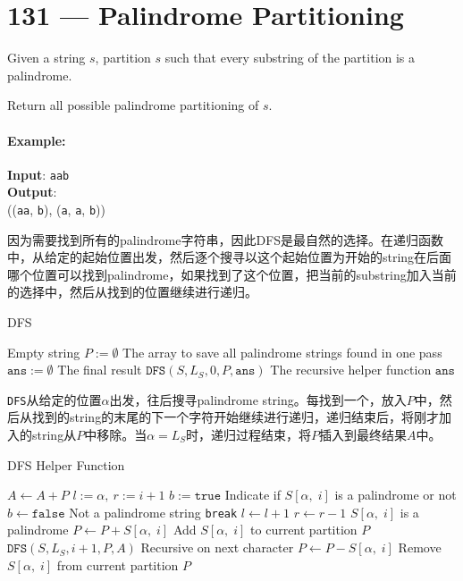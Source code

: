 \section{131 --- Palindrome Partitioning}
Given a string $s$, partition $s$ such that every substring of the partition is a palindrome.
\par
Return all possible palindrome partitioning of $s$.
\paragraph{Example:}
\begin{flushleft}
\textbf{Input}: \texttt{aab}
\\
\textbf{Output}:
\\
((\texttt{aa}, \texttt{b}), (\texttt{a}, \texttt{a}, \texttt{b}))
\end{flushleft}
因为需要找到所有的palindrome字符串，因此DFS是最自然的选择。在递归函数中，从给定的起始位置出发，然后逐个搜寻以这个起始位置为开始的string在后面哪个位置可以找到palindrome，如果找到了这个位置，把当前的substring加入当前的选择中，然后从找到的位置继续进行递归。

\setcounter{algorithm}{0}
\begin{algorithm}[H]
\caption{DFS}
\begin{algorithmic}[1]
\State \Return \Comment Empty string
\EndIf
\State $P:=\emptyset$ \Comment The array to save all palindrome strings found in one pass
\State $\texttt{ans} := \emptyset$ \Comment The final result
\State $\texttt{DFS}(S, L_S, 0, P, \texttt{ans})$ \Comment The recursive helper function
\State \Return $\texttt{ans}$
\EndProcedure
\end{algorithmic}
\end{algorithm}
\texttt{DFS}从给定的位置$\alpha$出发，往后搜寻palindrome string。每找到一个，放入$P$中，然后从找到的string的末尾的下一个字符开始继续进行递归，递归结束后，将刚才加入的string从$P$中移除。当$\alpha=L_S$时，递归过程结束，将$P$插入到最终结果$A$中。
\begin{algorithm}[H]
\caption{DFS Helper Function}
\begin{algorithmic}[1]
\State $A\gets A+P$ 
\EndIf
{}
\State $l:=\alpha,\ r:=i+1$
\State $b:=\texttt{true}$ \Comment Indicate if $S[\alpha,\;i]$ is a palindrome or not
\State $b\gets \texttt{false}$ \Comment Not a palindrome string
\State \texttt{break}
\EndIf
\State $l\gets l+1$
\State $r\gets r-1$
\EndWhile
{} \Comment $S[\alpha,\;i]$ is a palindrome
\State $P\gets P+S[\alpha,\;i]$ \Comment Add $S[\alpha,\;i]$ to current partition $P$
\State $\texttt{DFS}(S, L_S, i+1, P, A)$ \Comment Recursive on next character
\State $P\gets P-S[\alpha,\;i]$ \Comment Remove $S[\alpha,\;i]$ from current partition $P$
\EndIf
\EndFor
\EndFunction
\end{algorithmic}
\end{algorithm}